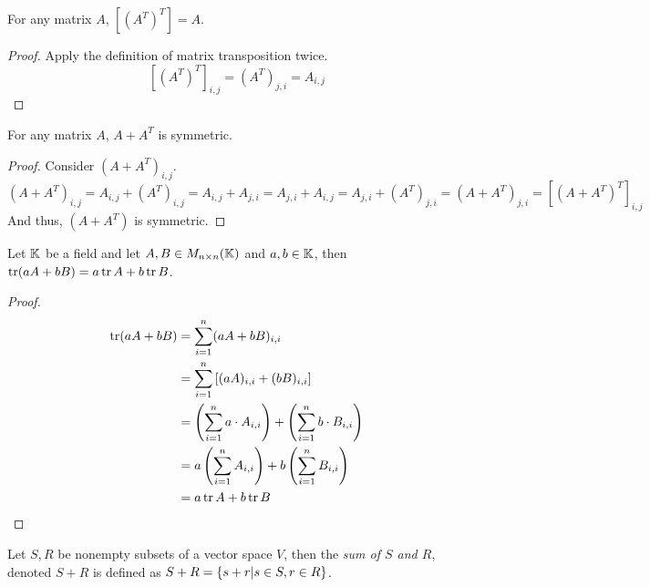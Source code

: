 \begin{proposition}
	For any matrix $A$, $[{(A^T)}^T]=A$.
\end{proposition}
\begin{proof}
	Apply the definition of matrix transposition twice.
	\[
		[{(A^T)}^T]_{i,j}=(A^T)_{j,i}=A_{i,j}
	\]
\end{proof}

\begin{proposition}
	For any matrix $A$, $A+A^T$ is symmetric.
\end{proposition}
\begin{proof}
	Consider $(A+A^T)_{i,j}$.
	\[
		(A+A^T)_{i,j} =
		A_{i,j} +(A^T)_{i,j} =
		A_{i,j} + A_{j,i} =
		A_{j,i} + A_{i,j} =
		A_{j,i} + (A^T)_{j,i} =
		(A+A^T)_{j,i} =
		[{(A+A^T)}^T]_{i,j}
	\]
	And thus, $(A+A^T)$ is symmetric.
\end{proof}

\begin{proposition}
	Let $\mathbb{K}$ be a field and let $A,B\in M_{n\times n}(\mathbb{K})$ and $a,b\in\mathbb{K}$, then $\operatorname{tr} (aA+bB)=a\operatorname{tr} A + b\operatorname{tr} B$.
\end{proposition}
\begin{proof}
	\begin{align*}
		\operatorname{tr} (aA+bB) &= \sum_{i=1}^n (aA+bB)_{i,i} \\
		&= \sum_{i=1}^n \left[ (aA)_{i,i}+(bB)_{i,i} \right] \\
		&= \left( \sum_{i=1}^n a\cdot A_{i,i} \right) + \left( \sum_{i=1}^n b\cdot B_{i,i} \right)\\
		&= a\left( \sum_{i=1}^n A_{i,i} \right) + b\left( \sum_{i=1}^n B_{i,i} \right)\\
		&= a\operatorname{tr} A + b\operatorname{tr} B
	\end{align*}
\end{proof}

\begin{definition}
	Let $S,R$ be nonempty subsets of a vector space $V$, then the \textit{sum of $S$ and $R$}, denoted $S+R$ is defined as $S+R=\lbrace s+r|s\in S, r\in R \rbrace$.
\end{definition}

